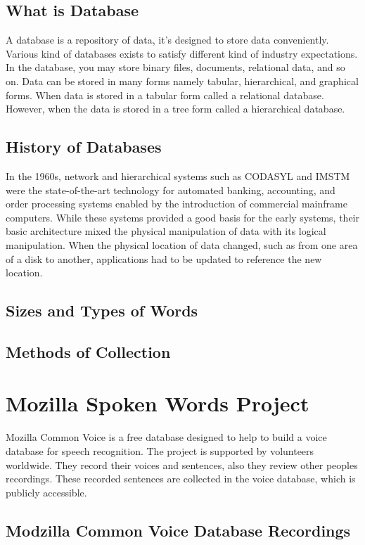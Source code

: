 \documentclass[english,12pt,oneside,a4paper]{article}
\begin{document}
\begin{center}
		\subsection{What is Database}
		A database is a repository of data, it's designed to store data conveniently. Various kind of databases exists to satisfy different kind of industry expectations. In the database, you may store binary files, documents, relational data, and so on. Data can be stored in many forms namely tabular, hierarchical, and graphical forms. When data is stored in a tabular form called a relational database. However, when the data is stored in a tree form called a hierarchical database.
		\subsection{History of Databases}
		In the 1960s, network and hierarchical systems such as CODASYL and IMSTM were the
		state-of-the-art technology for automated banking, accounting, and order processing
		systems enabled by the introduction of commercial mainframe computers. While these
		systems provided a good basis for the early systems, their basic architecture mixed the
		physical manipulation of data with its logical manipulation. When the physical location of data changed, such as from one area of a disk to another, applications had to be updated to reference the new location.
		\subsection{Sizes and Types of Words}
		
		\subsection{Methods of Collection}
		
		\section{Mozilla Spoken Words Project}
		Mozilla Common Voice is a free database designed to help to build a voice database for speech recognition. The project is supported by volunteers worldwide. They record their voices and sentences, also they review other peoples recordings. These recorded sentences are collected in the voice database, which is publicly accessible.
		\subsection{Modzilla Common Voice Database Recordings}
		

\end{center}
\end{document}
